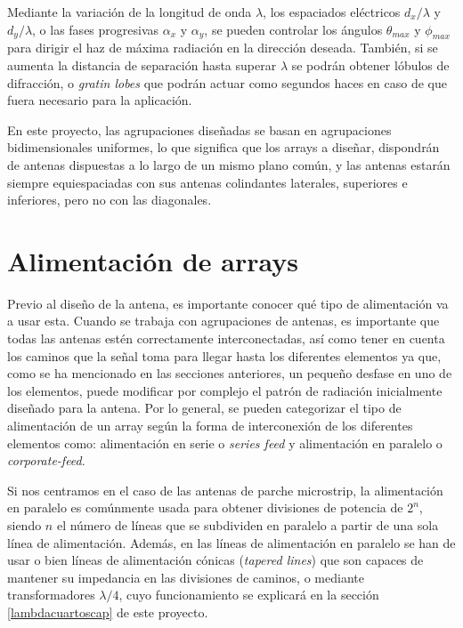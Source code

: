 \par Mediante la variación de la longitud de onda $\lambda$, los espaciados eléctricos $d_{x}/\lambda$ y $d_{y}/\lambda$, o las fases progresivas $\alpha_{x}$ y $\alpha_{y}$, se pueden controlar los ángulos $\theta_{max}$ y $\phi_{max}$ para dirigir el haz de máxima radiación en la dirección deseada. También, si se aumenta la distancia de separación hasta superar $\lambda$ se podrán obtener lóbulos de difracción, o \textit{gratin lobes} que podrán actuar como segundos haces en caso de que fuera necesario para la aplicación.
\\
\par En este proyecto, las agrupaciones diseñadas se basan en agrupaciones bidimensionales uniformes, lo que significa que los arrays a diseñar, dispondrán de antenas dispuestas a lo largo de un mismo plano común, y las antenas estarán siempre equiespaciadas con sus antenas colindantes laterales, superiores e inferiores, pero no con las diagonales. 

\section{Alimentación de arrays}
\par Previo al diseño de la antena, es importante conocer qué tipo de alimentación va a usar esta. Cuando se trabaja con agrupaciones de antenas, es importante que todas las antenas estén correctamente interconectadas, así como tener en cuenta los caminos que la señal toma para llegar hasta los diferentes elementos ya que, como se ha mencionado en las secciones anteriores, un pequeño desfase en uno de los elementos, puede modificar por complejo el patrón de radiación inicialmente diseñado para la antena. Por lo general, se pueden categorizar el tipo de alimentación de un array según la forma de interconexión de los diferentes elementos como: alimentación en serie o \textit{series feed} y alimentación en paralelo o \textit{corporate-feed}. 
\\
\par Si nos centramos en el caso de las antenas de parche microstrip, la alimentación en paralelo es comúnmente usada para obtener divisiones de potencia de $2^{n}$, siendo $n$ el número de líneas que se subdividen en paralelo a partir de una sola línea de alimentación. Además, en las líneas de alimentación en paralelo se han de usar o bien líneas de alimentación cónicas (\textit{tapered lines}) que son capaces de mantener su impedancia en las divisiones de caminos, o mediante transformadores $\lambda/4$, cuyo funcionamiento se explicará en la sección \ref{lambdacuartoscap} de este proyecto. \cite{Balanis2015}

